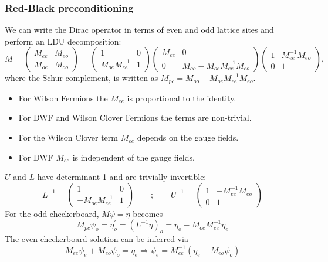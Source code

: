 \documentclass[pdf,ps,8pt]{beamer}
\begin{document}
\begin{frame}[fragile]\small\frametitle{ Red-Black preconditioning}

We can write the Dirac operator in terms of even and odd lattice sites and perform an LDU decomposition:
\begin{equation}
M = \left(
\begin{array}{cc}
M_{ee} & M_{eo} \\
M_{oe} & M_{oo}
\end{array}
\right)
= 
\left(
\begin{array}{cc}
1  &  0 \\
M_{oe} M_{ee}^{-1}  & 1
\end{array}
\right)
\left(
\begin{array}{cc}
M_{ee} & 0\\
0 & M_{oo} - M_{oe}M_{ee}^{-1} M_{eo}
\end{array}
\right)
\left(
\begin{array}{cc}
1 &  M_{ee}^{-1}M_{eo}\\
0  & 1
\end{array}
\right),
\end{equation}
where the Schur complement, is written as $M_{pc} = M_{oo} - M_{oe}M_{ee}^{-1} M_{eo}$.

\begin{itemize}
  \item For Wilson Fermions the $M_{ee}$ is proportional to the identity.
  \item For DWF and Wilson Clover Fermions the terms are non-trivial.
  \item For the Wilson Clover term $M_{ee}$ depends on the gauge fields.
  \item For DWF $M_{ee}$ is independent of the gauge fields.
\end{itemize}

$U$ and $L$ have determinant 1 and are trivially invertible:
$$
L^{-1} = 
\left(
\begin{array}{cc}
1  &  0 \\
- M_{oe} M_{ee}^{-1}  & 1
\end{array}
\right)
\quad\quad ; \quad \quad 
U^{-1} = 
\left(
\begin{array}{cc}
1 & - M_{ee}^{-1}M_{eo}\\
0  & 1
\end{array}
\right)
$$
For the odd checkerboard, $M\psi = \eta$ becomes
$$
 M_{pc} \psi_o = \eta^\prime_o = (L^{-1} \eta)_o = \eta_o - M_{oe} M_{ee}^{-1} \eta_e
$$
The even checkerboard solution can be inferred via 
$$
M_{ee} \psi_e + M_{eo} \psi_o = \eta_e \Rightarrow \psi_e = M_{ee}^{-1} (\eta_e - M_{eo} \psi_o)
$$
\begin{center}
\end{center}
\end{frame}
\end{document}
